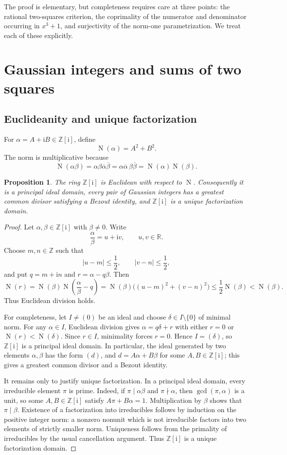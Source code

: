 \documentclass[11pt,a4paper]{article}
\numberwithin{equation}{section}
\newtheorem{proposition}[theorem]{Proposition}
\theoremstyle{definition}
\newcommand{\R}{\mathbb{R}}
\newcommand{\Z}{\mathbb{Z}}
\newcommand{\N}{\operatorname{N}}
\newcommand{\conj}[1]{\overline{#1}}
\newcommand{\ii}{\mathrm{i}}
\begin{document}
The proof is elementary, but completeness requires care at three points: the rational two-squares criterion, the coprimality of the numerator and denominator occurring in $x^3+1$, and surjectivity of the norm-one parametrization. We treat each of these explicitly.

\section{Gaussian integers and sums of two squares}

\subsection{Euclideanity and unique factorization}

For $\alpha=A+\ii B\in\Z[\ii]$, define
\[
 \N(\alpha)=A^2+B^2.
\]
The norm is multiplicative because
\[
 \N(\alpha\beta)=\alpha\beta\conj{\alpha}\conj{\beta}
 =\alpha\conj{\alpha}\,\beta\conj{\beta}
 =\N(\alpha)\N(\beta).
\]

\begin{proposition}
\label{prop:gaussian-euclidean}
The ring $\Z[\ii]$ is Euclidean with respect to $\N$. Consequently it is a principal ideal domain, every pair of Gaussian integers has a greatest common divisor satisfying a Bezout identity, and $\Z[\ii]$ is a unique factorization domain.
\end{proposition}

\begin{proof}
Let $\alpha,\beta\in\Z[\ii]$ with $\beta\ne0$. Write
\[
 \frac{\alpha}{\beta}=u+\ii v,
 \qquad u,v\in\R.
\]
Choose $m,n\in\Z$ such that
\[
 |u-m|\le\frac12,
 \qquad
 |v-n|\le\frac12,
\]
and put $q=m+\ii n$ and $r=\alpha-q\beta$. Then
\[
 \N(r)
 =\N(\beta)\N\!\left(\frac{\alpha}{\beta}-q\right)
 =\N(\beta)\bigl((u-m)^2+(v-n)^2\bigr)
 \le\frac12\N(\beta)
 <\N(\beta).
\]
Thus Euclidean division holds.

For completeness, let $I\ne(0)$ be an ideal and choose $\delta\in I\setminus\{0\}$ of minimal norm. For any $\alpha\in I$, Euclidean division gives $\alpha=q\delta+r$ with either $r=0$ or $\N(r)<\N(\delta)$. Since $r\in I$, minimality forces $r=0$. Hence $I=(\delta)$, so $\Z[\ii]$ is a principal ideal domain. In particular, the ideal generated by two elements $\alpha,\beta$ has the form $(d)$, and $d=A\alpha+B\beta$ for some $A,B\in\Z[\ii]$; this gives a greatest common divisor and a Bezout identity.

It remains only to justify unique factorization. In a principal ideal domain, every irreducible element $\pi$ is prime. Indeed, if $\pi\mid\alpha\beta$ and $\pi\nmid\alpha$, then $\gcd(\pi,\alpha)$ is a unit, so some $A,B\in\Z[\ii]$ satisfy $A\pi+B\alpha=1$. Multiplication by $\beta$ shows that $\pi\mid\beta$. Existence of a factorization into irreducibles follows by induction on the positive integer norm: a nonzero nonunit which is not irreducible factors into two elements of strictly smaller norm. Uniqueness follows from the primality of irreducibles by the usual cancellation argument. Thus $\Z[\ii]$ is a unique factorization domain.
\end{proof}
\end{document}
